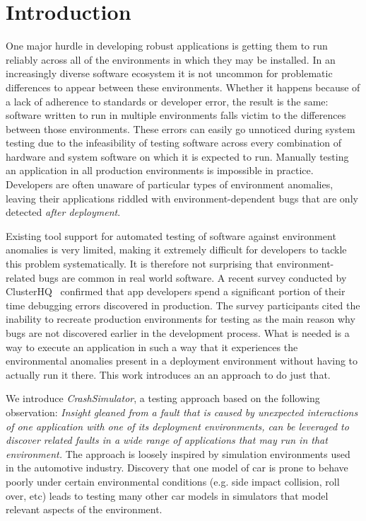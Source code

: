 \section{Introduction}

One major hurdle in developing robust applications is getting them to run reliably across all of the environments in
which they may be installed.  In an increasingly diverse software ecosystem it is not uncommon for problematic
differences to appear between these environments.  Whether it happens because of a lack of adherence to standards or
developer error, the result is the same: software written to run in multiple environments falls victim to the
differences between those environments.  These errors can easily go unnoticed 
during system testing due to the infeasibility of testing software
across every combination of hardware and system software on which it is expected to run.  Manually testing an application in
all production environments is impossible in practice. Developers are often unaware of particular types of environment
anomalies, leaving their applications riddled with environment-dependent bugs that are only detected \emph{after
  deployment}.

Existing tool support for automated testing of software against environment anomalies is very limited, making it
extremely difficult for developers to tackle this problem systematically.  It is therefore not surprising that
environment-related bugs are common in real world software. A recent survey conducted by
ClusterHQ~\cite{ClusterHQSurvey} confirmed that app developers spend a significant portion of their time debugging
errors discovered in production.  The survey participants cited the inability to recreate production environments for
testing as the main reason why bugs are not discovered earlier in the development process.  What is needed is a way to
execute an application in such a way that it experiences the environmental anomalies present in a deployment environment
without having to actually run it there.  This work introduces an an approach to do just that.

We introduce {\em CrashSimulator}, a testing approach based on the following observation:
{\em Insight gleaned from a fault that is caused by unexpected interactions 
of {\em one application} with one of its deployment environments, can be leveraged 
to discover related faults in a {\em wide range} of applications that may run in that environment.}
The approach is loosely inspired by simulation environments used in the automotive industry. Discovery
that one model of car is prone to behave poorly under certain environmental conditions (e.g. side impact collision,
roll over, etc) leads to testing many other car models in simulators that model relevant aspects of the environment.

